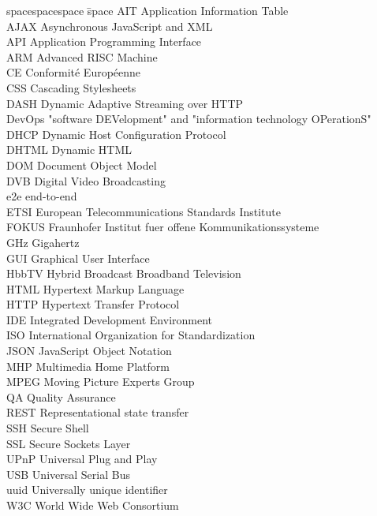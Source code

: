
\begin{tabbing}
spacespacespace \= space \kill
AIT \> Application Information Table\\
AJAX \> Asynchronous JavaScript and XML\\
API \> Application Programming Interface\\
ARM \> Advanced RISC Machine\\
CE \> Conformité Européenne\\
CSS \> Cascading Stylesheets\\
DASH \> Dynamic Adaptive Streaming over HTTP\\
DevOps \> "software DEVelopment" and "information technology OPerationS"\\
DHCP \> Dynamic Host Configuration Protocol\\
DHTML \> Dynamic HTML\\
DOM \> Document Object Model\\
DVB \> Digital Video Broadcasting\\
e2e \> end-to-end\\
ETSI \> European Telecommunications Standards Institute\\
FOKUS \> Fraunhofer Institut fuer offene Kommunikationssysteme\\
GHz \> Gigahertz\\
GUI \> Graphical User Interface\\
HbbTV \> Hybrid Broadcast Broadband Television\\
HTML \> Hypertext Markup Language\\
HTTP \> Hypertext Transfer Protocol\\
IDE \> Integrated Development Environment\\
ISO \> International Organization for Standardization\\
JSON \> JavaScript Object Notation\\
MHP \> Multimedia Home Platform\\
MPEG \> Moving Picture Experts Group\\
QA \> Quality Assurance\\
REST \> Representational state transfer\\
SSH \> Secure Shell\\
SSL \> Secure Sockets Layer\\
UPnP \> Universal Plug and Play\\
USB \> Universal Serial Bus\\
uuid \> Universally unique identifier\\
W3C \> World Wide Web Consortium\\
\end{tabbing}
\endinput
